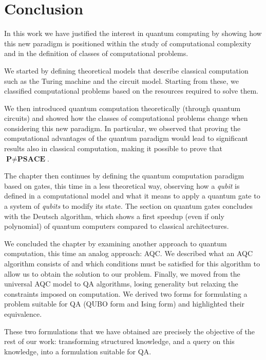 \section{Conclusion}
In this work we have justified the interest in quantum computing by showing how this new paradigm is positioned within the study of computational complexity and in the definition of classes of computational problems.

We started by defining theoretical models that describe classical computation such as the Turing machine and the circuit model. Starting from these, we classified computational problems based on the resources required to solve them.

We then introduced quantum computation theoretically (through quantum circuits) and showed how the classes of computational problems change when considering this new paradigm. In particular, we observed that proving the computational advantages of the quantum paradigm would lead to significant results also in classical computation, making it possible to prove that $\textbf{P} \neq \textbf{PSACE}$.

The chapter then continues by defining the quantum computation paradigm based on gates, this time in a less theoretical way, observing how a \emph{qubit} is defined in a computational model and what it means to apply a quantum gate to a system of \emph{qubits} to modify its state. The section on quantum gates concludes with the Deutsch algorithm, which shows a first speedup (even if only polynomial) of quantum computers compared to classical architectures.

We concluded the chapter by examining another approach to quantum computation, this time an analog approach: AQC. We described what an AQC algorithm consists of and which conditions must be satisfied for this algorithm to allow us to obtain the solution to our problem. Finally, we moved from the universal AQC model to QA algorithms, losing generality but relaxing the constraints imposed on computation. We derived two forms for formulating a problem suitable for QA (QUBO form and Ising form) and highlighted their equivalence.

These two formulations that we have obtained are precisely the objective of the rest of our work: transforming structured knowledge, and a query on this knowledge, into a formulation suitable for QA.